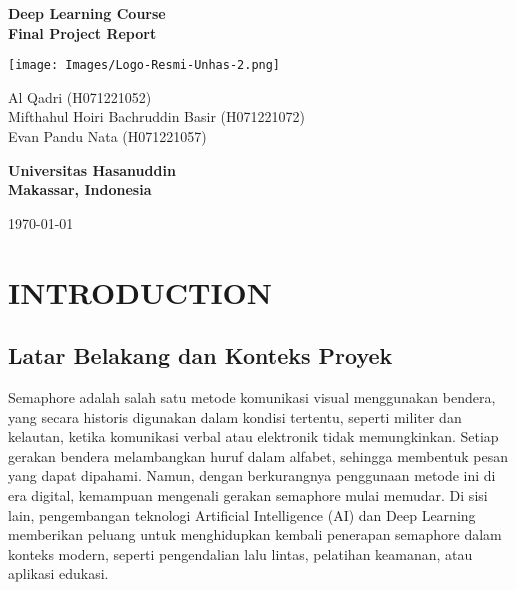 \documentclass[12pt,a4paper]{article}
\begin{document}
\begin{titlepage}
    \centering
    {\Large\textbf{Deep Learning Course \\ Final Project Report}\par} %
    \vspace{2cm} %
    \texttt{[image: Images/Logo-Resmi-Unhas-2.png]}\par %
    \vspace{2cm} %
    {\large
    Al Qadri (H071221052)\\ 
    Mifthahul Hoiri Bachruddin Basir (H071221072)\\ 
    Evan Pandu Nata (H071221057)\par}
    \vspace{1cm} %
    \textbf{Universitas Hasanuddin}\\
    \textbf{Makassar, Indonesia}\\[0.5cm]
    {\large\today\par} %
\end{titlepage}

\normalsize  %
\tableofcontents
\newpage

\section{INTRODUCTION}
\subsection{Latar Belakang dan Konteks Proyek}
\begin{adjustwidth}{3em}{0pt} 
\hspace{0.5cm} Semaphore adalah salah satu metode komunikasi visual menggunakan bendera, yang secara historis digunakan dalam kondisi tertentu, seperti militer dan kelautan, ketika komunikasi verbal atau elektronik tidak memungkinkan. Setiap gerakan bendera melambangkan huruf dalam alfabet, sehingga membentuk pesan yang dapat dipahami. Namun, dengan berkurangnya penggunaan metode ini di era digital, kemampuan mengenali gerakan semaphore mulai memudar. Di sisi lain, pengembangan teknologi Artificial Intelligence (AI) dan Deep Learning memberikan peluang untuk menghidupkan kembali penerapan semaphore dalam konteks modern, seperti pengendalian lalu lintas, pelatihan keamanan, atau aplikasi edukasi.\end{adjustwidth}
\
\end{document}
